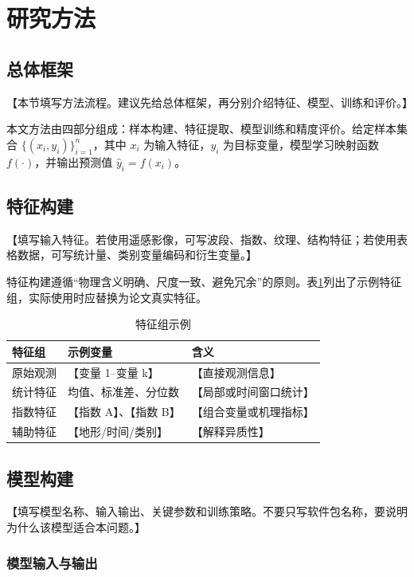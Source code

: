 \section{研究方法}\label{ch:method}

\subsection{总体框架}

【本节填写方法流程。建议先给总体框架，再分别介绍特征、模型、训练和评价。】

本文方法由四部分组成：样本构建、特征提取、模型训练和精度评价。给定样本集合 $\{(x_i,y_i)\}_{i=1}^{n}$，其中 $x_i$ 为输入特征，$y_i$ 为目标变量，模型学习映射函数 $f(\cdot)$，并输出预测值 $\hat{y}_i=f(x_i)$。

\subsection{特征构建}

【填写输入特征。若使用遥感影像，可写波段、指数、纹理、结构特征；若使用表格数据，可写统计量、类别变量编码和衍生变量。】

特征构建遵循“物理含义明确、尺度一致、避免冗余”的原则。表\ref{tab:feature-groups}列出了示例特征组，实际使用时应替换为论文真实特征。

\begin{table}[ht]
  \centering
  \caption{特征组示例}
  \label{tab:feature-groups}
  \begin{tabular}{lll}
    \toprule
    特征组 & 示例变量 & 含义 \\
    \midrule
    原始观测 & 【变量 1--变量 k】 & 【直接观测信息】 \\
    统计特征 & 均值、标准差、分位数 & 【局部或时间窗口统计】 \\
    指数特征 & 【指数 A】、【指数 B】 & 【组合变量或机理指标】 \\
    辅助特征 & 【地形/时间/类别】 & 【解释异质性】 \\
    \bottomrule
  \end{tabular}
\end{table}

\subsection{模型构建}

【填写模型名称、输入输出、关键参数和训练策略。不要只写软件包名称，要说明为什么该模型适合本问题。】

\subsubsection{模型输入与输出}

